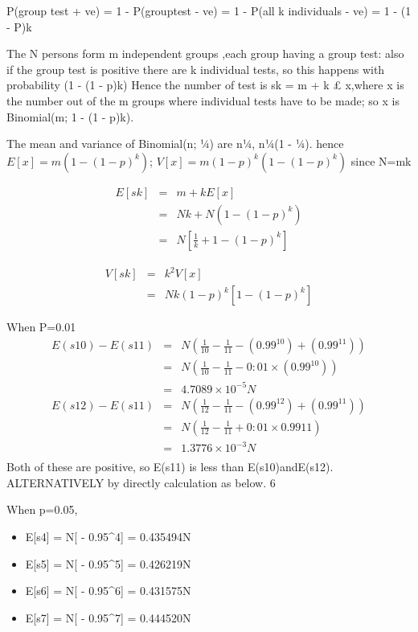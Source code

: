 \documentclass[a4paper,12pt]{article}
\begin{document}
\item 
P(group test + ve) = 1 - P(grouptest - ve)
= 1 - P(all k individuals - ve)
= 1 - (1 - P)k
\item The N persons form m independent groups ,each group having a group test: also
if the group test is positive there are k individual tests, so this happens with probability
(1 - (1 - p)k)
Hence the number of test is sk = m + k £ x,where x is the number out of the m
groups where individual tests have to be made; so x is Binomial(m; 1 - (1 - p)k).

\item The mean and variance of Binomial(n; ¼) are n¼, n¼(1 - ¼). hence
$E[x] = m(1 - (1 - p)^{k})$; 
$V [x] = m(1 - p)^{k}(1 - (1 - p)^{k})
$
since N=mk

\begin{eqnarray*}
E[sk] &=& m + kE[x] \\&=& N
k + N(1 - (1 - p)^{k}) 
\\&=& N[ \frac{1}{
k} + 1 - (1 - p)^{k}]
\end{eqnarray*}

\begin{eqnarray*}
V [sk] &=& k^2V [x] \\&=& Nk(1 - p)^{k}[1 - (1 - p)^{k}]
\end{eqnarray*}


\item When P=0.01
\begin{eqnarray*}
E(s10) - E(s11) &=& N( \frac{1}{10} -  \frac{1}{11} - (0.99^{10}) + (0.99^{11}))
\\&=& N( \frac{1}{10} - \frac{1}{11} - 0:01 \times (0.99^{10})) \\&=& 4.7089 \times 10^{-5}N
\end{eqnarray*}
\begin{eqnarray*}
E(s12) - E(s11) &=& N( \frac{1}{12} - \frac{1}{11} - (0.99^{12}) + (0.99^{11}))\\&=& N( \frac{1}{12} - \frac{1}{11} + 0:01 \times 0.9911) \\&=&
 1.3776 \times 10^{-3} N\\
\end{eqnarray*}
Both of these are positive, so E(s11) is less than E(s10)andE(s12).
ALTERNATIVELY by directly calculation as below.
6
\item When p=0.05,
\begin{itemize}
\item E[s4] = N[ - 0.95^4] = 0.435494N
\item E[s5] = N[ - 0.95^5] = 0.426219N
\item E[s6] = N[ - 0.95^6] = 0.431575N
\item E[s7] = N[ - 0.95^7] = 0.444520N
\end{itemize}
\end{document}
